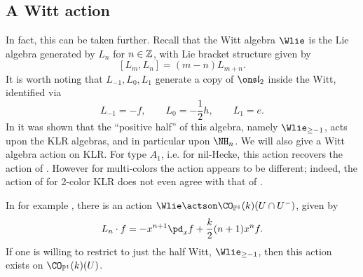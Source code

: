 \documentclass[11pt,reqno]{amsart}
\begin{document}
\subsection{A Witt action}
In fact, this can be taken further. Recall that the Witt algebra $\Wlie$ is the Lie algebra generated by $L_n$ for $n\in\mathbb Z$, with Lie bracket structure given by
\[[L_m,L_n]=(m-n)L_{m+n}.\] 
It is worth noting that $L_{-1},L_0,L_1$ generate a copy of $\sl_2$ inside the Witt, identified via 
\[L_{-1}=-f,\qquad L_0=-\frac{1}{2}h,\qquad L_1=e.\] 
In \cite{lauda2025action} it was shown that the ``positive half'' of this algebra, namely $\Wlie_{\ge -1}$, acts upon the KLR algebras, and in particular upon $\NH_n$. We will also give a Witt algebra action on KLR. For type $A_1$, i.e. for nil-Hecke, this action recovers the action of \cite{lauda2025action}. However for multi-colors the action appears to be different; indeed, the action of \cite{lauda2025action} for 2-color KLR does not even agree with that of \cite{EQ23}. 

In for example \cite[Equation 4.10]{schlichenmaier2016krichever}, there is an action $\Wlie\actson \CO_{\BP^1}(k)(U\cap U^-)$, given by 
\[L_n\cdot f=-x^{n+1}\pd_x f+\frac{k}{2}(n+1)x^nf.\]%
If one is willing to restrict to just the half Witt, $\Wlie_{\ge -1}$, then this action exists on $\CO_{\BP^1}(k)(U)$. 

\end{document}
